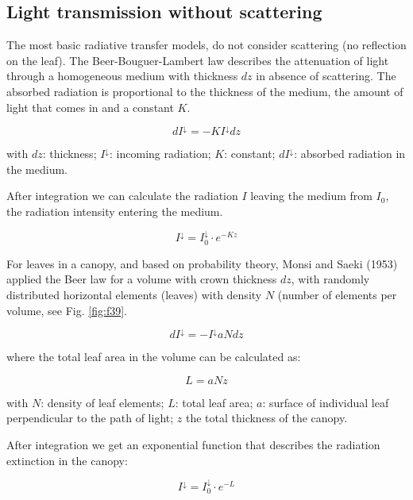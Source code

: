 \documentclass[12pt,oneside]{book}
\begin{document}
\subsection{Light transmission without
scattering}\label{light-transmission-without-scattering}

The most basic radiative transfer models, do not consider scattering (no
reflection on the leaf). The Beer-Bouguer-Lambert law describes the
attenuation of light through a homogeneous medium with thickness \(dz\)
in absence of scattering. The absorbed radiation is proportional to the
thickness of the medium, the amount of light that comes in and a
constant \(K\).

\[
dI^{\downarrow} = -KI^\downarrow dz
\]

with \(dz\): thickness; \(I^\downarrow\): incoming radiation; \(K\):
constant; \(dI^\downarrow\): absorbed radiation in the medium.

After integration we can calculate the radiation \(I\) leaving the
medium from \(I_0\), the radiation intensity entering the medium.

\[
I^{\downarrow} = I^{\downarrow}_0\cdot e^{-Kz}
\]

For leaves in a canopy, and based on probability theory, Monsi and Saeki
(1953) applied the Beer law for a volume with crown thickness \(dz\),
with randomly distributed horizontal elements (leaves) with density
\(N\) (number of elements per volume, see Fig. \ref{fig:f39}.

\[
dI^{\downarrow} = - I^{\downarrow} a N dz
\]

where the total leaf area in the volume can be calculated as:

\[
L = aNz
\]

with \(N\): density of leaf elements; \(L\): total leaf area; \(a\):
surface of individual leaf perpendicular to the path of light; \(z\) the
total thickness of the canopy.

After integration we get an exponential function that describes the
radiation extinction in the canopy:

\[
I^{\downarrow} = I^{\downarrow}_0\cdot e^{-L}
\]
\end{document}
